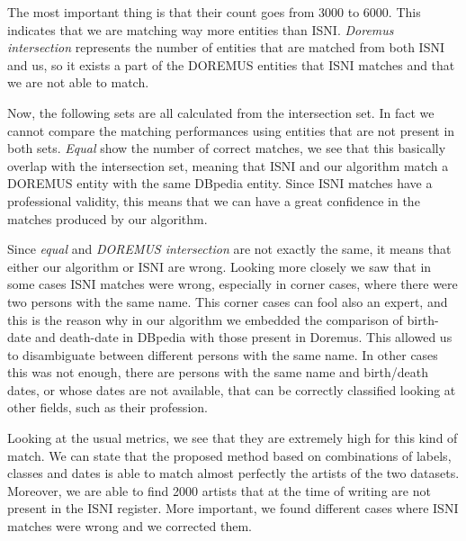 \documentclass[paper=a4, fontsize=11pt]{scrartcl}
\newcommand{\textapprox}{\raisebox{0.5ex}{\texttildelow}}
\begin{document}
The most important thing is that their count goes from \textapprox3000 to \textapprox6000. This indicates that we are matching way more entities than ISNI.
\textit{Doremus intersection} represents the number of entities that are matched from both ISNI and us, so it exists a part of the DOREMUS entities that ISNI matches and that we are not able to match.

Now, the following sets are all calculated from the intersection set. In fact we cannot compare the matching performances using entities that are not present in both sets.
\textit{Equal} show the number of correct matches, we see that this basically overlap with the intersection set, meaning that ISNI and our algorithm match a DOREMUS entity with the same DBpedia entity. Since ISNI matches have a professional validity, this means that we can have a great confidence in the matches produced by our algorithm.

Since \textit{equal} and \textit{DOREMUS intersection} are not exactly the same, it means that either our algorithm or ISNI are wrong. Looking more closely we saw that in some cases ISNI matches were wrong, especially in corner cases, where there were two persons with the same name. This corner cases can fool also an expert, and this is the reason why in our algorithm we embedded the comparison of birth-date and death-date in DBpedia with those present in Doremus. This allowed us to disambiguate between different persons with the same name. In other cases this was not enough, there are persons with the same name and birth/death dates, or whose dates are not available, that can be correctly classified looking at other fields, such as their profession.

Looking at the usual metrics, we see that they are extremely high for this kind of match. We can state that the proposed method based on combinations of labels, classes and dates is able to match almost perfectly the artists of the two datasets. Moreover, we are able to find 2000 artists that at the time of writing are not present in the ISNI register. More important, we found different cases where ISNI matches were wrong and we corrected them.
\end{document}
